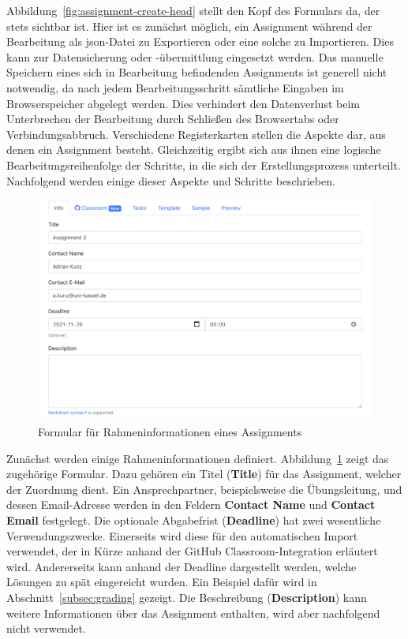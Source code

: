 Abbildung~\ref{fig:assignment-create-head} stellt den Kopf des Formulars da, der stets sichtbar ist.
Hier ist es zunächst möglich, ein Assignment während der Bearbeitung als \ac{json}-Datei zu Exportieren oder eine solche zu Importieren.
Dies kann zur Datensicherung oder -übermittlung eingesetzt werden.
Das manuelle Speichern eines sich in Bearbeitung befindenden Assignments ist generell nicht notwendig, da nach jedem Bearbeitungsschritt sämtliche Eingaben im Browserspeicher abgelegt werden.
Dies verhindert den Datenverlust beim Unterbrechen der Bearbeitung durch Schließen des Browsertabs oder Verbindungsabbruch.
Verschiedene Registerkarten stellen die Aspekte dar, aus denen ein Assignment besteht.
Gleichzeitig ergibt sich aus ihnen eine logische Bearbeitungsreihenfolge der Schritte, in die sich der Erstellungsprozess unterteilt.
Nachfolgend werden einige dieser Aspekte und Schritte beschrieben.

\begin{figure}
    \centering
    \includegraphics[width=\textwidth]{images/assignment-create-info}
    \caption{Formular für Rahmeninformationen eines Assignments}
    \label{fig:assignment-create-info}
\end{figure}

Zunächst werden einige Rahmeninformationen definiert.
Abbildung~\ref{fig:assignment-create-info} zeigt das zugehörige Formular.
Dazu gehören ein Titel (\textbf{Title}) für das Assignment, welcher der Zuordnung dient.
Ein Ansprechpartner, beispielsweise die Übungsleitung, und dessen Email-Adresse werden in den Feldern \textbf{Contact Name} und \textbf{Contact Email} festgelegt.
Die optionale Abgabefrist (\textbf{Deadline}) hat zwei wesentliche Verwendungszwecke.
Einerseits wird diese für den automatischen Import verwendet, der in Kürze anhand der GitHub Classroom-Integration erläutert wird.
Andererseits kann anhand der Deadline dargestellt werden, welche Lösungen zu spät eingereicht wurden.
Ein Beispiel dafür wird in Abschnitt~\ref{subsec:grading} gezeigt.
Die Beschreibung (\textbf{Description}) kann weitere Informationen über das Assignment enthalten, wird aber nachfolgend nicht verwendet.

